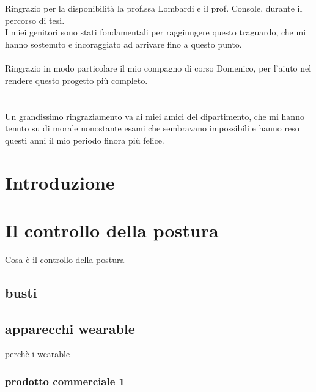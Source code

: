 \documentclass[a4paper,12pt]{report}
\begin{document}
\thispagestyle{empty}
\setlength{\parindent}{0pt}
\textbf{\scalebox{1.30}{Ringraziamenti}}\\
\\Ringrazio per la disponibilità la prof.ssa Lombardi e il prof. Console, durante il percorso di tesi.
\\I miei genitori sono stati fondamentali per raggiungere questo traguardo, che mi hanno sostenuto e incoraggiato ad arrivare fino a questo punto.\\
\\Ringrazio in modo particolare il mio compagno di corso Domenico,  per l'aiuto nel rendere questo progetto più completo.\\
\\
\\Un grandissimo ringraziamento va ai miei amici del dipartimento, che mi hanno tenuto su di morale nonostante esami che sembravano impossibili e hanno reso questi anni il mio periodo finora più felice.\\
\maketitle
\tableofcontents{}

\fancyhead{}
\fancyhead[RO,LE]{\slshape \leftmark}
\fancyfoot[C]{\thepage}
\renewcommand{\headrulewidth}{0.4pt}
\renewcommand{\footrulewidth}{0pt}

\setlength{\parindent}{0pt}

\newpage\null\thispagestyle{empty}\newpage

\chapter{Introduzione}

\chapter{Il controllo della postura}
Cosa è il controllo della postura
\section{busti}

\newpage
\section{apparecchi wearable}

perchè i wearable
\subsection{prodotto commerciale 1}
\end{document}
